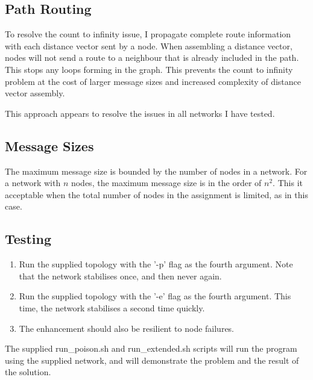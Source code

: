 \documentclass{article}
\begin{document}
\subsection*{Path Routing}

To resolve the count to infinity issue, I propagate complete route information with each distance vector sent by a node. When assembling a distance vector, nodes will not send a route to a neighbour that is already included in the path. This stops any loops forming in the graph. This prevents the count to infinity problem at the cost of larger message sizes and increased complexity of distance vector assembly.

This approach appears to resolve the issues in all networks I have tested.

\subsection*{Message Sizes}

The maximum message size is bounded by the number of nodes in a network. For a network with $n$ nodes, the maximum message size is in the order of $n^2$. This it acceptable when the total number of nodes in the assignment is limited, as in this case.

\subsection*{Testing}

\begin{enumerate}

  \item Run the supplied topology with the '-p' flag as the fourth argument. Note that the network stabilises once, and then never again.
  
  \item Run the supplied topology with the '-e' flag as the fourth argument. This time, the network stabilises a second time quickly.
  
  \item The enhancement should also be resilient to node failures.

\end{enumerate}

The supplied run\_poison.sh and run\_extended.sh scripts will run the program using the supplied network, and will demonstrate the problem and the result of the solution.
\end{document}
